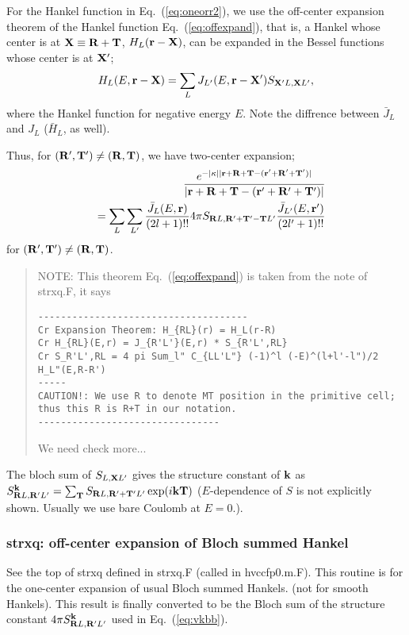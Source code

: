 \documentclass[a4paper,10pt,epsf,fleqn]{article}
\newcommand{\bfk}{{\bf k}}
\newcommand{\bfr}{{\bf r}}
\newcommand{\bfX}{{\bf X}}
\newcommand{\bfT}{{\bf T}}
\newcommand{\bfR}{{\bf R}}
\newcommand{\req}[1]{\mbox{Eq.~(\ref{#1})}}
\begin{document}
For the Hankel function in \req{eq:oneorr2}, we use
the off-center expansion theorem of the
Hankel function \req{eq:offexpand}, that is, 
a Hankel whose center is at $\bfX\equiv\bfR+\bfT$, $H_L(\bfr-\bfX)$, 
can be expanded in the Bessel functions whose center is at $\bfX'$;
\begin{eqnarray}
{H}_L(E,\bfr-\bfX)=\sum_L {J}_{L'}(E,\bfr-\bfX') S_{\bfX'{L},\bfX{L'}} ,
\label{eq:offexpand}
\end{eqnarray}
where the Hankel function for negative energy $E$.
Note the diffrence between $\bar{J}_L$ and $J_L$ ($\bar{H}_L$, as well).

Thus, for $(\bfR',\bfT')\neq(\bfR,\bfT)$, 
we have two-center expansion;
\begin{eqnarray}
&&\frac{e^{-|\kappa||\bfr+\bfR+\bfT-(\bfr'+\bfR'+\bfT')|}}
{|\bfr+\bfR+\bfT-(\bfr'+\bfR'+\bfT')|}
\nonumber \\
&&= \sum_L \sum_{L'}
\frac{\bar{J}_L(E,\bfr)}{(2l+1)!!} 
4 \pi S_{\bfR{L},\bfR'+\bfT'-\bfT{L'}} 
\frac{\bar{J}_{L'}(E,\bfr')}{(2l'+1)!!} \label{eq:vtwoc}
\end{eqnarray}
for $(\bfR',\bfT')\neq(\bfR,\bfT)$. 

\begin{quote}
NOTE: This theorem \req{eq:offexpand} is taken from the note of
strxq.F, it says
\begin{verbatim}
-------------------------------------
Cr Expansion Theorem: H_{RL}(r) = H_L(r-R)
Cr H_{RL}(E,r) = J_{R'L'}(E,r) * S_{R'L',RL}
Cr S_R'L',RL = 4 pi Sum_l" C_{LL'L"} (-1)^l (-E)^(l+l'-l")/2 H_L"(E,R-R')
-----
CAUTION!: We use R to denote MT position in the primitive cell; 
thus this R is R+T in our notation.
--------------------------------
\end{verbatim}
We need check more...
\end{quote}

%
%
%

The bloch sum of $S_{{L},\bfX{L'}}$
gives the structure constant of $\bfk$ as
$S^\bfk_{\bfR{L},\bfR'{L'}}=
\sum_\bfT S_{\bfR{L},\bfR'+\bfT'{L'}}\exp(i \bfk \bfT)$
($E$-dependence of $S$ is not explicitly shown. Usually
we use bare Coulomb at $E=0$.).
 
\subsubsection{strxq: off-center expansion of Bloch summed Hankel}
See the top of strxq defined in strxq.F (called in hvccfp0.m.F). 
This routine is for the one-center expansion of usual Bloch summed Hankels. (not for smooth Hankels).
This result is finally converted to be the 
Bloch sum of the structure constant 
$4 \pi S^{\bfk}_{\bfR{L},\bfR'{L'}}$ used in \req{eq:vkbb}.
\end{document}
